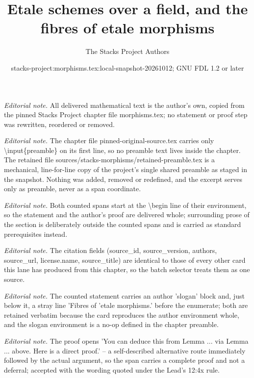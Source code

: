 \documentclass[10pt,a4paper]{amsart}
\title{Etale schemes over a field, and the fibres of etale morphisms}
\author{The Stacks Project Authors}
\date{stacks-project:morphisms.tex:local-snapshot-20261012; GNU FDL 1.2 or later}
\theoremstyle{plain}
\theoremstyle{definition}
\theoremstyle{remark}
\numberwithin{equation}{subsection}
\begin{document}
\maketitle
\setcounter{subsection}{1}
\noindent\textit{Editorial note.} All delivered mathematical text is the author's own, copied from the pinned Stacks Project chapter file morphisms.tex; no statement or proof step was rewritten, reordered or removed.\par\medskip
\noindent\textit{Editorial note.} The chapter file pinned-original-source.tex carries only \textbackslash{}input\{preamble\} on its first line, so no preamble text lives inside the chapter. The retained file sources/stacks-morphisms/retained-preamble.tex is a mechanical, line-for-line copy of the project's single shared preamble as staged in the snapshot. Nothing was added, removed or redefined, and the excerpt serves only as preamble, never as a span coordinate.\par\medskip
\noindent\textit{Editorial note.} Both counted spans start at the \textbackslash{}begin line of their environment, so the statement and the author's proof are delivered whole; surrounding prose of the section is deliberately outside the counted spans and is carried as standard prerequisites instead.\par\medskip
\noindent\textit{Editorial note.} The citation fields (source\_id, source\_version, authors, source\_url, license.name, source\_title) are identical to those of every other card this lane has produced from this chapter, so the batch selector treats them as one source.\par\medskip
\noindent\textit{Editorial note.} The counted statement carries an author 'slogan' block and, just below it, a stray line 'Fibres of 'etale morphisms.' before the enumerate; both are retained verbatim because the card reproduces the author environment whole, and the slogan environment is a no-op defined in the chapter preamble.\par\medskip
\noindent\textit{Editorial note.} The proof opens 'You can deduce this from Lemma ... via Lemma ... above. Here is a direct proof.' -- a self-described alternative route immediately followed by the actual argument, so the span carries a complete proof and not a deferral; accepted with the wording quoted under the Lead's 12:4x rule.\par\medskip
\end{document}
